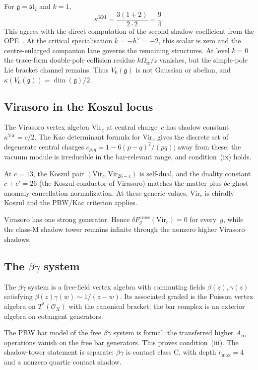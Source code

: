 \documentclass[11pt,reqno]{amsart}
\theoremstyle{definition}
\theoremstyle{remark}
\newcommand{\cO}{\mathcal{O}}
\newcommand{\fg}{\mathfrak{g}}
\newcommand{\Vir}{\mathrm{Vir}}
\newcommand{\KM}{\mathrm{KM}}
\numberwithin{equation}{section}
\begin{document}
For $\fg = \mathfrak{sl}_2$ and $k = 1$,
\[
\kappa^{\KM}
 = \frac{3(1+2)}{2\cdot 2}
 = \frac{9}{4}.
\]
This agrees with the direct computation of the second shadow
coefficient from the OPE~\cite[\S3.1]{LorgatMKD1}.  At the critical
specialisation $k=-h^\vee=-2$, this scalar is zero and the
centre-enlarged companion lane governs the remaining structures. At
level $k=0$ the trace-form
double-pole collision residue $k\Omega_{\mathrm{tr}}/z$ vanishes,
but the simple-pole Lie bracket channel remains. Thus
$V_0(\fg)$ is not Gaussian or abelian, and
$\kappa(V_0(\fg))=\dim(\fg)/2$.

\subsection{Virasoro in the Koszul locus}

The Virasoro vertex algebra $\Vir_c$ at central charge~$c$ has
shadow constant $\kappa^{\Vir} = c/2$. The Kac determinant formula
for $\Vir_c$ gives the discrete set of degenerate central charges
$c_{p,q} = 1 - 6(p-q)^2/(pq)$; away from these, the vacuum module
is irreducible in the bar-relevant range, and condition~(ix)
holds.

At $c = 13$, the Koszul pair $(\Vir_c,\Vir_{26-c})$ is self-dual,
and the duality constant $c + c' = 26$ (the Koszul conductor of
Virasoro) matches the matter plus $bc$ ghost anomaly-cancellation
normalization.
At these generic values, $\Vir_c$ is chirally Koszul and the
PBW/Kac criterion applies.

Virasoro has one strong generator. Hence
$\delta F_g^{\mathrm{cross}}(\Vir_c)=0$ for every~$g$, while the
class-M shadow tower remains infinite through the nonzero higher
Virasoro shadows.

\subsection{The \texorpdfstring{$\beta\gamma$}{betagamma} system}

The $\beta\gamma$ system is a free-field vertex algebra with
commuting fields $\beta(z), \gamma(z)$ satisfying
$\beta(z)\gamma(w)\sim 1/(z-w)$. Its associated graded is the
Poisson vertex algebra on $T^*(\cO_X)$ with the canonical
bracket; the bar complex is an exterior algebra on cotangent
generators.

The PBW bar model of the free $\beta\gamma$ system is formal:
the transferred higher $A_\infty$ operations vanish on the free
bar generators. This proves condition~\textup{(iii)}. The
shadow-tower statement is separate: $\beta\gamma$ is contact class
C, with depth $r_{\max}=4$ and a nonzero quartic contact shadow.
\end{document}
